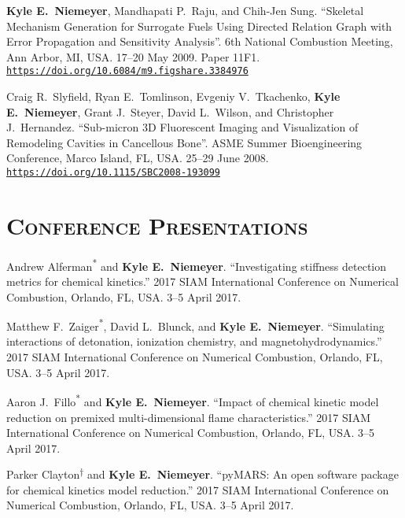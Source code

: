 \documentclass[margin,line,11pt]{res}
\makeatletter
\newlength{\bibhang}
\newlength{\bibsep}
 {\@listi \global\bibsep\itemsep \global\advance\bibsep by\parsep}
\newenvironment{bibenum*}
  {\renewcommand\labelenumi{\theenumi.}%
   \etaremune[
     topsep=0pt,
     itemsep=\bibsep,
     parsep=0pt,partopsep=0pt,
     itemindent=-\bibhang,
     leftmargin={\bibhang+\widthof{[999]}}]}
  {\endetaremune}
\newcommand*{\doi}[1]{\href{https://doi.org/#1}{\nolinkurl{https://doi.org/#1}}}
\newcommand*{\grad}[0]{\textsuperscript{*}}
\newcommand*{\ugrad}[0]{\textsuperscript{$\dagger$}}
\makeatother
\begin{document}
\begin{resume}
\begin{bibenum*}
\item \textbf{Kyle E.~Niemeyer}, Mandhapati P.\ Raju, and Chih-Jen Sung.
``Skeletal Mechanism Generation for Surrogate Fuels Using Directed Relation Graph with Error Propagation and Sensitivity Analysis''.
6th National Combustion Meeting, Ann Arbor, MI, USA.
17--20 May 2009.
Paper 11F1.
\doi{10.6084/m9.figshare.3384976}

\item Craig R.\ Slyfield, Ryan E.\ Tomlinson,  Evgeniy V.\ Tkachenko, \textbf{Kyle E.~Niemeyer}, Grant J.\ Steyer, David L.\ Wilson, and Christopher J.\ Hernandez.
``Sub-micron 3D Fluorescent Imaging and Visualization of Remodeling Cavities in Cancellous Bone''.
ASME Summer Bioengineering Conference, Marco Island, FL, USA.
25--29 June 2008. \\
\doi{10.1115/SBC2008-193099}

\end{bibenum*}

\section{\textsc{Conference Presentations}}

\begin{bibenum*}

\item Andrew Alferman\grad{} and \textbf{Kyle E.~Niemeyer}.
``Investigating stiffness detection metrics for chemical kinetics.''
2017 SIAM International Conference on Numerical Combustion, Orlando, FL, USA.
3--5 April 2017.

\item Matthew F.~Zaiger\grad{}, David L.~Blunck, and \textbf{Kyle E.~Niemeyer}.
``Simulating interactions of detonation, ionization chemistry, and magnetohydrodynamics.''
2017 SIAM International Conference on Numerical Combustion, Orlando, FL, USA.
3--5 April 2017.

\item Aaron J.~Fillo\grad{} and \textbf{Kyle E.~Niemeyer}.
``Impact of chemical kinetic model reduction on premixed multi-dimensional flame characteristics.''
2017 SIAM International Conference on Numerical Combustion, Orlando, FL, USA.
3--5 April 2017.

\item Parker Clayton\ugrad{} and \textbf{Kyle E.~Niemeyer}.
``pyMARS: An open software package for chemical kinetics model reduction.''
2017 SIAM International Conference on Numerical Combustion, Orlando, FL, USA.
3--5 April 2017.


\end{bibenum*}
\end{resume}
\end{document}

